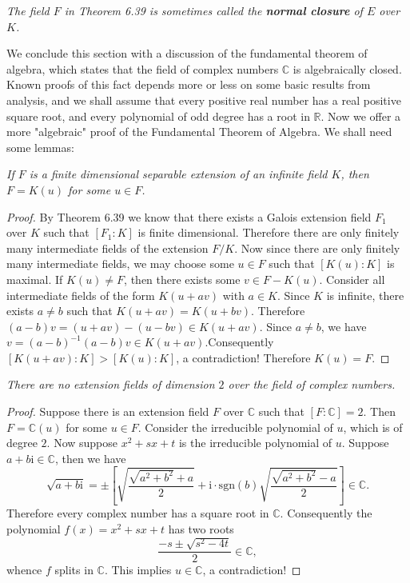 \begin{note}\em
The field $F$ in Theorem 6.39 is sometimes called the \textbf{normal closure} of $E$ over $K$.
\end{note}
We conclude this section with a discussion of the fundamental theorem of algebra, which states that the field of complex numbers $\mathbb{C}$ is algebraically closed. Known proofs of this fact depends more or less on some basic results from analysis, and we shall assume that every positive real number has a real positive square root, and every polynomial of odd degree has a root in $\mathbb{R}$. Now we offer a more "algebraic" proof of the Fundamental Theorem of Algebra. We shall need some lemmas: 
\begin{lemma}\em
If $F$ is a finite dimensional separable extension of an infinite field $K$, then $F=K(u)$ for some $u\in F$.
\end{lemma}
\begin{proof}
By Theorem 6.39 we know that there exists a Galois extension field $F_1$ over $K$ such that $[F_1:K]$ is finite dimensional. Therefore there are only finitely many intermediate fields of the extension $F/K$. Now since there are only finitely many intermediate fields, we may choose some $u\in F$ such that $[K(u):K]$ is maximal. If $K(u)\ne F$, then there exists some $v\in F-K(u)$. Consider all intermediate fields of the form $K(u+av)$ with $a\in K$. Since $K$ is infinite, there exists $a\ne b$ such that $K(u+av)=K(u+bv)$. Therefore $(a-b)v=(u+av)-(u-bv)\in K(u+av)$. Since $a\ne b$, we have $v=(a-b)^{-1}(a-b)v\in K(u+av)$.Consequently $[K(u+av):K]>[K(u):K]$, a contradiction! Therefore $K(u)=F$.
\end{proof}
\begin{lemma}\em
There are no extension fields of dimension $2$ over the field of complex numbers.
\end{lemma}
\begin{proof}
Suppose there is an extension field $F$ over $\mathbb{C}$ such that $[F:\mathbb{C}]=2$. Then $F=\mathbb{C}(u)$ for some $u\in F$. Consider the irreducible polynomial of $u$, which is of degree $2$. Now suppose $x^2+sx+t$ is the irreducible polynomial of $u$. Suppose $a+b\mathrm{i}\in\mathbb{C}$, then we have 
$$
\sqrt{a+b\mathrm{i}}=\pm \left[ \sqrt{\frac{\sqrt{a^2+b^2}+a}{2}}+\mathrm{i}\cdot \mathrm{sgn} \left( b \right) \sqrt{\frac{\sqrt{a^2+b^2}-a}{2}} \right] \in \mathbb{C} .
$$
Therefore every complex number has a square root in $\mathbb{C}$. Consequently the polynomial $f(x)=x^2+sx+t$ has two roots 
$$
\frac{-s\pm \sqrt{s^2-4t}}{2}\in \mathbb{C} ,
$$
whence $f$ splits in $\mathbb{C}$. This implies $u\in\mathbb{C}$, a contradiction!
\end{proof}
